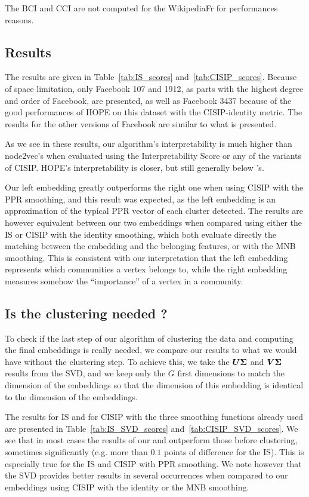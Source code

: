 The BCI and CCI are not computed for the WikipediaFr for performances reasons.

\subsection{Results}
The results are given in Table~\ref{tab:IS_scores} and~\ref{tab:CISIP_scores}. Because of space limitation, only Facebook 107 and 1912, as parts with the highest degree and order of Facebook, are presented, as well as Facebook 3437 because of the good performances of HOPE on this dataset with the CISIP-identity metric. The results for the other versions of Facebook are similar to what is presented.

As we see in these results, our algorithm's interpretability is much higher than node2vec's when evaluated using the Interpretability Score or any of the variants of CISIP. HOPE's interpretability is closer, but still generally below \parfaite{}'s.

Our left embedding greatly outperforms the right one when using CISIP with the PPR smoothing, and this result was expected, as the left embedding is an approximation of the typical PPR vector of each cluster detected. The results are however equivalent between our two embeddings when compared using either the IS or CISIP with the identity smoothing, which both evaluate directly the matching between the embedding and the belonging features, or with the MNB smoothing. This is consistent with our interpretation that the left embedding represents which communities a vertex belongs to, while the right embedding measures somehow the “importance” of a vertex in a community.

\subsection{Is the clustering needed ?}
To check if the last step of our algorithm of clustering the data and computing the final embeddings is really needed, we compare our results to what we would have without the clustering step. To achieve this, we take the $\boldsymbol{U}\boldsymbol{\Sigma}$ and $\boldsymbol{V}\boldsymbol{\Sigma}$ results from the SVD, and we keep only the $G$ first dimensions to match the dimension of the \parfaite{} embeddings so that the dimension of this embedding is identical to the dimension of the \parfaite{} embeddings.

The results for IS and for CISIP with the three smoothing functions already used are presented in Table~\ref{tab:IS_SVD_scores} and~\ref{tab:CISIP_SVD_scores}. We see that in most cases the results of our \newembLeft{} and \newembRight{} outperform those before clustering, sometimes significantly (e.g. more than $0.1$ points of difference for the IS). This is especially true for the IS and CISIP with PPR smoothing. We note however that the SVD provides better results in several occurrences when compared to our embeddings using CISIP with the identity or the MNB smoothing.

